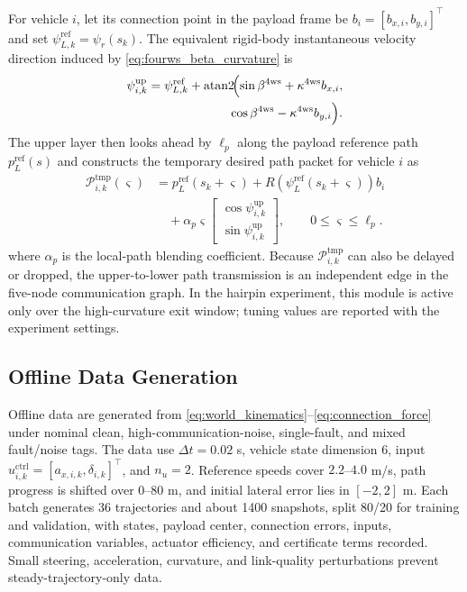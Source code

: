 \documentclass[letterpaper,journal]{IEEEtran}
\begin{document}
For vehicle $i$, let its connection point in the payload frame be $b_i=[b_{x,i},b_{y,i}]^\top$ and set $\psi_{L,k}^{\mathrm{ref}}=\psi_r(s_k)$. The equivalent rigid-body instantaneous velocity direction induced by \eqref{eq:fourws_beta_curvature} is
\begin{equation}
\begin{aligned}
\psi_{i,k}^{\mathrm{up}}
&=\psi_{L,k}^{\mathrm{ref}}+
\operatorname{atan2}\!\Bigl(
\sin\beta^{\mathrm{4ws}}+\kappa^{\mathrm{4ws}} b_{x,i},\\
&\hspace{6.5em}
\cos\beta^{\mathrm{4ws}}-\kappa^{\mathrm{4ws}} b_{y,i}
\Bigr).
\end{aligned}
\label{eq:fourws_vehicle_heading}
\end{equation}
The upper layer then looks ahead by $\ell_p$ along the payload reference path $p_L^{\mathrm{ref}}(s)$ and constructs the temporary desired path packet for vehicle $i$ as
\begingroup\small
\begin{equation}
\begin{aligned}
\mathcal P_{i,k}^{\mathrm{tmp}}(\varsigma)
&=p_{L}^{\mathrm{ref}}(s_k+\varsigma)
+R\!\left(\psi_L^{\mathrm{ref}}(s_k+\varsigma)\right)b_i\\
&\quad+\alpha_p \varsigma
\begin{bmatrix}
\cos \psi_{i,k}^{\mathrm{up}}\\
\sin \psi_{i,k}^{\mathrm{up}}
\end{bmatrix},
\qquad 0\le\varsigma\le\ell_p .
\end{aligned}
\label{eq:fourws_local_path}
\end{equation}
\endgroup
where $\alpha_p$ is the local-path blending coefficient. Because $\mathcal P_{i,k}^{\mathrm{tmp}}$ can also be delayed or dropped, the upper-to-lower path transmission is an independent edge in the five-node communication graph. In the hairpin experiment, this module is active only over the high-curvature exit window; tuning values are reported with the experiment settings.

\subsection{Offline Data Generation}

Offline data are generated from \eqref{eq:world_kinematics}--\eqref{eq:connection_force} under nominal clean, high-communication-noise, single-fault, and mixed fault/noise tags. The data use $\Delta t=0.02$ s, vehicle state dimension $6$, input $u_{i,k}^{\mathrm{ctrl}}=[a_{x,i,k},\delta_{i,k}]^\top$, and $n_u=2$. Reference speeds cover $2.2$--$4.0$ m/s, path progress is shifted over $0$--$80$ m, and initial lateral error lies in $[-2,2]$ m. Each batch generates 36 trajectories and about 1400 snapshots, split 80/20 for training and validation, with states, payload center, connection errors, inputs, communication variables, actuator efficiency, and certificate terms recorded. Small steering, acceleration, curvature, and link-quality perturbations prevent steady-trajectory-only data.
\end{document}
